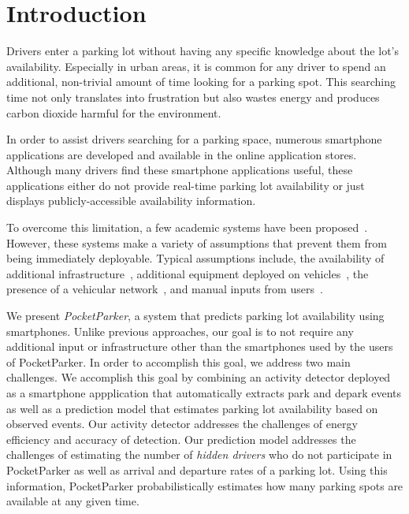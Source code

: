 \section{Introduction}

Drivers enter a parking lot without having any specific knowledge about the
lot's availability. Especially in urban areas, it is common for any driver to
spend an additional, non-trivial amount of time looking for a parking spot. This
searching time not only translates into frustration but also wastes energy and
produces carbon dioxide harmful for the environment.

In order to assist drivers searching for a parking space, numerous smartphone
applications are developed and available in the online application stores.
Although many drivers find these smartphone applications useful, these
applications either do not provide real-time parking lot availability or
just displays publicly-accessible availability information. 

To overcome this limitation, a few academic systems have been
proposed~\cite{4212497, Chen:2012:COS, Delot:2009:CRP, 5062057,
Mathur:2010:PDS}. However, these systems make a variety of assumptions that
prevent them from being immediately deployable. Typical assumptions include, the
availability of additional infrastructure~\cite{5062057}, additional equipment
deployed on vehicles~\cite{Mathur:2010:PDS}, the presence of a vehicular
network~\cite{Delot:2009:CRP, Mathur:2010:PDS, 4212497}, and manual inputs from
users~\cite{Chen:2012:COS}.

We present {\it PocketParker}, a system that predicts parking lot availability
using smartphones. Unlike previous approaches, our goal is to not require any
additional input or infrastructure other than the smartphones used by the users
of PocketParker. In order to accomplish this goal, we address two main
challenges. We accomplish this goal by combining an activity detector
deployed as a smartphone appplication that automatically extracts park and
depark events as well as a prediction model that estimates parking lot
availability based on observed events. Our activity detector addresses the
challenges of energy efficiency and accuracy of detection. Our prediction model
addresses the challenges of estimating the number of {\it hidden drivers} who do
not participate in PocketParker as well as arrival and departure rates of a
parking lot. Using this information, PocketParker probabilistically estimates
how many parking spots are available at any given time.

